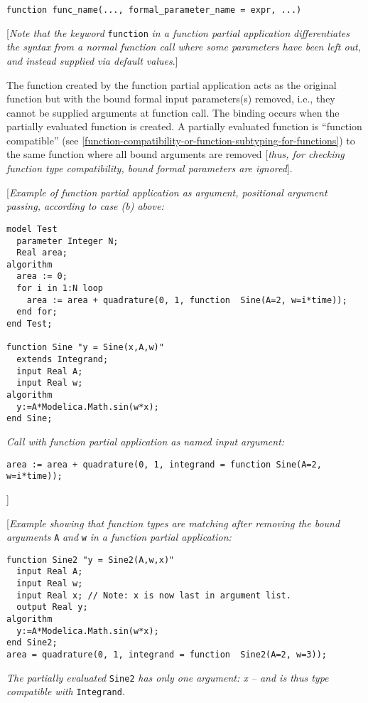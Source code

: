 \begin{lstlisting}[language=modelica]
  function func_name(..., formal_parameter_name = expr, ...)
\end{lstlisting}
{[}\emph{Note that the keyword} \lstinline!function! \emph{in a function partial
application} \emph{differentiates the syntax from a normal function call
where some parameters have been left out, and instead supplied via
default values}.{]}

The function created by the function partial application acts as the
original function but with the bound formal input parameters(s) removed,
i.e., they cannot be supplied arguments at function call. The binding
occurs when the partially evaluated function is created. A partially
evaluated function is ``function compatible'' (see \autoref{function-compatibility-or-function-subtyping-for-functions}) to the
same function where all bound arguments are removed {[}\emph{thus, for
checking function type compatibility, bound formal parameters are
ignored}{]}.

{[}\emph{Example of function partial application as argument, positional
argument passing, according to case (b) above:}

\begin{lstlisting}[language=modelica]
model Test
  parameter Integer N;
  Real area;
algorithm
  area := 0;
  for i in 1:N loop
    area := area + quadrature(0, 1, function  Sine(A=2, w=i*time));
  end for;
end Test;

function Sine "y = Sine(x,A,w)"
  extends Integrand;
  input Real A;
  input Real w;
algorithm
  y:=A*Modelica.Math.sin(w*x);
end Sine;
\end{lstlisting}
\emph{Call with function partial application as named input argument:}
\begin{lstlisting}[language=modelica]
area := area + quadrature(0, 1, integrand = function Sine(A=2, w=i*time));
\end{lstlisting}
{]}

{[}\emph{Example showing that function types are matching after removing
the bound arguments} \lstinline!A! \emph{and} \lstinline!w! \emph{in a function partial
application:}

\begin{lstlisting}[language=modelica]
  function Sine2 "y = Sine2(A,w,x)"
  input Real A;
  input Real w;
  input Real x; // Note: x is now last in argument list.
  output Real y;
algorithm
  y:=A*Modelica.Math.sin(w*x);
end Sine2;
area = quadrature(0, 1, integrand = function  Sine2(A=2, w=3));
\end{lstlisting}
\emph{The partially evaluated} \lstinline!Sine2! \emph{has only one argument: x --
and is thus type compatible with} \lstinline!Integrand!\emph{.}

